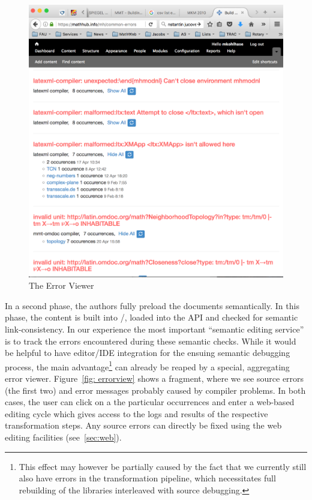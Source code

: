 \begin{figure}[ht]\centering
  \includegraphics[width=12cm]{errorview}
  \caption{The \sys Error Viewer}\label{fig:errorview}
\end{figure}

In a second phase, the authors fully preload the documents semantically. In this phase,
the content is built into \omdoc/\mmt, loaded into the \mmt API and checked for semantic
link-consistency. In our experience the most important ``semantic editing service'' is to
track the errors encountered during these semantic checks. While it would be helpful to
have editor/IDE integration for the ensuing semantic debugging process, the main
advantage\footnote{This effect may however be partially caused by the fact that we
  currently still also have errors in the transformation pipeline, which necessitates full
  rebuilding of the \sys libraries interleaved with source debugging.}  can already be
reaped by a special, aggregating error viewer.  Figure~\ref{fig: errorview} shows a
fragment, where we see source errors (the first two) and error messages probably caused by
compiler problems. In both cases, the user can click on a the particular occurrences and
enter a web-based editing cycle which gives access to the logs and results of the
respective transformation steps. Any source errors can directly be fixed using the web
editing facilities (see~\ref{sec:web}).

